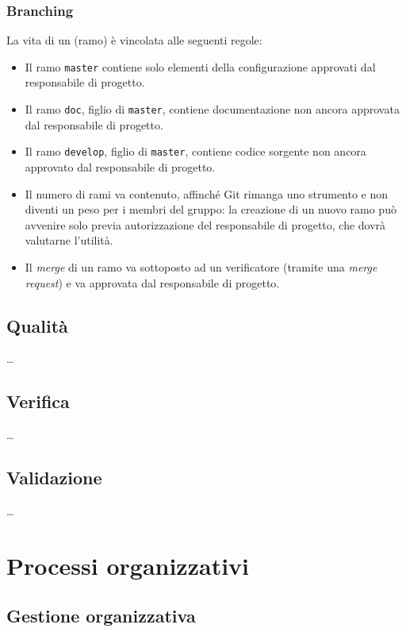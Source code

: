 \subsubsection{Branching} La vita di un  (ramo) è vincolata alle seguenti regole:
\begin{itemize}
	\item Il ramo \texttt{master} contiene solo elementi della configurazione approvati dal responsabile di progetto.
	\item Il ramo \texttt{doc}, figlio di \texttt{master}, contiene documentazione non ancora approvata dal responsabile di progetto.
	\item Il ramo \texttt{develop}, figlio di \texttt{master}, contiene codice sorgente non ancora approvato dal responsabile di progetto.
	\item Il numero di rami va contenuto, affinché Git rimanga uno strumento e non diventi un peso per i membri del gruppo: la creazione di un nuovo ramo può avvenire solo previa autorizzazione del responsabile di progetto, che dovrà valutarne l'utilità.
	\item Il \emph{merge} di un ramo va sottoposto ad un verificatore (tramite una \emph{merge request}) e va approvata dal responsabile di progetto.
\end{itemize}

\subsection{Qualità} \dots

\subsection{Verifica} \dots

\subsection{Validazione} \dots




\section{Processi organizzativi}

\subsection{Gestione organizzativa}

